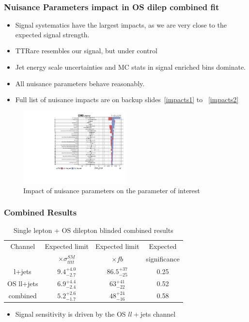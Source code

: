\documentclass{beamer}
\begin{document}

\begin{frame}
\frametitle{Nuisance Parameters impact in OS dilep combined fit}
\vspace{-5pt}
\begin{itemize}
	\item {\small Signal systematics have the largest impacts, as we are very close to the expected signal strength.}
	\item {\small TTRare resembles our signal, but under control}
	\item {\small Jet energy scale uncertainties and MC stats in signal enriched bins dominate.}
	\item {\small All nuisance parameters behave reasonably.}
	\item {\small Full list of nuisance impacts are on backup slides~\ref{impacts1} to ~\ref{impacts2}}
\end{itemize}
\vspace{-5pt}
\begin{figure}
	\includegraphics[width=0.5\textwidth]{impacts1.pdf}
	\vspace{-10pt} \caption{Impact of nuisance parameters on the parameter of interest}
\end{figure}
\end{frame}


\begin{frame}
\frametitle{Combined Results}

\begin{table}
\caption{Single lepton + OS dilepton blinded combined results}
\vspace{0pt} 
\begin{tabular}{| c | c | c | c |}
\hline
Channel	&Expected limit	&Expected limit	&Expected \\
 & $\times \sigma_{t\bar{t}t\bar{t}}^{SM}$ &  $\times fb$ &significance \\
\hline
l+jets	& $9.4^{+4.0}_{-2.7}$ & $86.5^{+37}_{-25}$ & 0.25 \\
\hline
OS ll+jets		&$6.9_{-2.4}^{+4.4}$ &$63_{-22}^{+41}$ & 0.52  \\
\hline
combined &$5.2_{-1.7}^{+2.6}$ &$48_{-16}^{+24}$ & 0.58 \\
\hline
\end{tabular} 
\end{table}
\begin{itemize}
\item Signal sensitivity is driven by the OS $ll+$jets channel
\end{itemize}
\end{frame}
\end{document}

